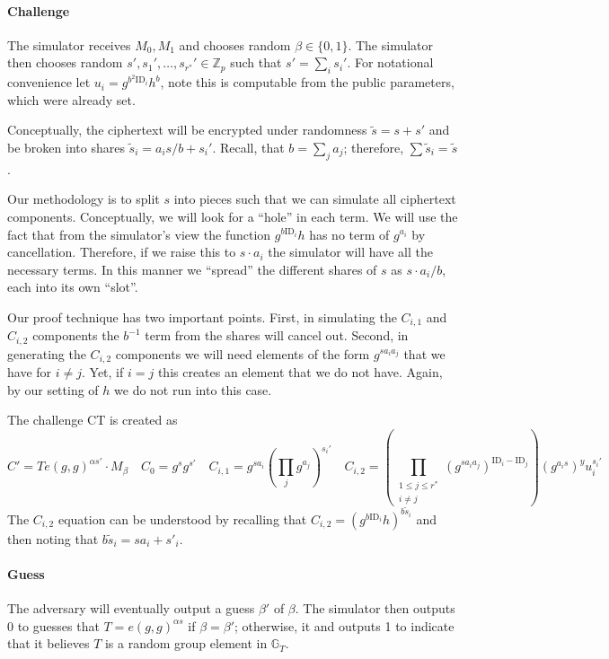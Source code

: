 \documentclass[a4paper, 11pt]{article}
\newcommand{\Z}{\ensuremath{\mathbb{Z}}}
\newcommand{\G}{\ensuremath{\mathbb{G}}}
\theoremstyle{definition}
\newcommand{\ID}{\ensuremath{\textrm{ID}}}
\begin{document}
\paragraph{Challenge}
The simulator receives $M_0,M_1$ and chooses random $\beta \in \{0,1\}$.
The simulator then chooses random $s',s_1',\ldots,s_{r^*}' \in \Z_p$ such that
$s'=\sum_{i} s_i'$. For notational convenience let $u_i = g^{b^2 \ID_i} h^b$, note
this is computable from the public parameters, which were already set.


Conceptually, the ciphertext will be encrypted under randomness $\tilde{s}=s+s'$ and be
broken into shares $\tilde{s}_i=a_i s/b+s_i'$. Recall, that $b=\sum_{j} a_j$; therefore,
$\sum \tilde{s}_i= \tilde{s}$.

Our methodology is to split $s$ into pieces such that we can simulate
all ciphertext components.
Conceptually, we will look for a ``hole'' in each
term. We will use the fact that from the simulator's view the function $g^{b \ID_i} h$
has no term of $g^{a_i}$ by cancellation. Therefore, if we raise this to $s \cdot a_i$ the
simulator will have all the necessary terms. In this manner we ``spread'' the different
shares of $s$ as $s \cdot a_i /b$, each into its own ``slot''.


Our proof technique has two important points. First, in simulating the $C_{i,1}$ and $C_{i,2}$
components the $b^{-1}$ term from the shares will cancel out. Second, in generating the
$C_{i,2}$ components we will need elements of the form $g^{s a_i a_j}$ that we have for
$i \neq j$. Yet, if $i=j$ this creates an element that we do not have. Again, by our setting
of $h$ we do not run into this case.


The challenge CT is created as
\[
C'=T e(g,g)^{\alpha s'} \cdot M_{\beta} \quad
C_0 = g^s g^{s'} \quad
C_{i,1}= g^{s a_i} (\prod_{j} g^{a_j} )^{s_i'} \quad
C_{i,2}= \left( \prod_{\substack{1 \leq j\leq r^* \\  i \neq j}}
   (g^{s a_i a_j})^{\ID_i - \ID_j} \right) (g^{a_i s})^y
   u_i^{s_i'}
\]
The $C_{i,2}$ equation can be understood by recalling that $C_{i,2}=(g^{b\ID_i} h)^{b \tilde{s}_i}$
and then noting that $b \tilde{s}_i= s a_i + s'_i$.


\paragraph{Guess}

The adversary will eventually output a guess $\beta'$ of $\beta$. The
simulator then outputs $0$ to guesses that $T=e(g,g)^{\alpha s}$ if
$\beta=\beta'$; otherwise, it and outputs 1 to indicate that it believes
$T$ is a random group element in $\G_T$.
\end{document}
